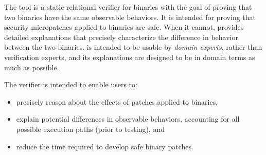 The \TOOL{} tool is a static relational verifier for binaries with the goal of proving that two binaries have the same observable behaviors. %
It is intended for proving that security micropatches applied to binaries are safe. %
When it cannot, \TOOL{} provides detailed explanations that precisely characterize the difference in behavior between the two binaries. %
\TOOL{} is intended to be usable by \emph{domain experts}, rather than verification experts, and its explanations are designed to be in domain terms as much as possible. %

The \TOOL{} verifier is intended to enable users to: %
\begin{itemize}
\item precisely reason about the effects of patches applied to binaries,
\item explain potential differences in observable behaviors, accounting for all possible execution paths (prior to testing), and
\item reduce the time required to develop safe binary patches.
\end{itemize}
